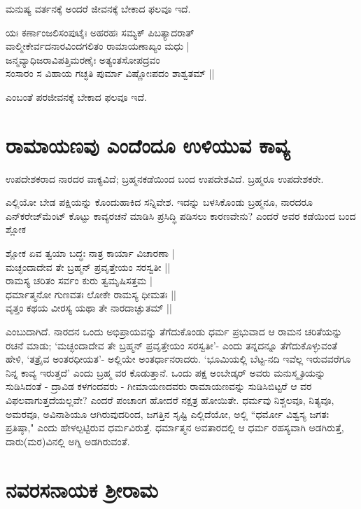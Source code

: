 ಮನುಷ್ಯ ವರ್ತನಕ್ಕೆ ಅಂದರೆ ಜೀವನಕ್ಕೆ ಬೇಕಾದ ಫಲವೂ ಇದೆ. 

\begin{shloka} 
ಯಃ ಕರ್ಣಾಂಜಲಿಸಂಪುಟೈಃ ಅಹರಹಃ ಸಮ್ಯಕ್‍ ಪಿಬತ್ಯಾದರಾತ್‍\\ 
ವಾಲ್ಮೀಕೇರ್ವದನಾರವಿಂದಗಲಿತಂ ರಾಮಾಯಣಾಖ್ಯಂ ಮಧು |\\ 
ಜನ್ಮವ್ಯಾಧಿಜರಾವಿಪತ್ತಿಮರಣೈಃ ಅತ್ಯಂತಸೋಪದ್ರವಂ\\ 
ಸಂಸಾರಂ ಸ ವಿಹಾಯ ಗಚ್ಛತಿ ಪುರ್ಮಾ ವಿಷ್ಣೋಃಪದಂ ಶಾಶ್ವತಮ್‍ ||
\end{shloka} 
ಎಂಬಂತೆ ಪರಜೀವನಕ್ಕೆ ಬೇಕಾದ ಫಲವೂ ಇದೆ. 

\section*{ರಾಮಾಯಣವು ಎಂದೆಂದೂ ಉಳಿಯುವ ಕಾವ್ಯ} 

ಉಪದೇಶಕರಾದ ನಾರದರ ವಾಕ್ಯವಿದೆ; ಬ್ರಹ್ಮನಕಡೆಯಿಂದ ಬಂದ ಉಪದೇಶವಿದೆ. ಬ್ರಹ್ಮರೂ ಉಪದೇಶಕರೇ. 


ಎಲ್ಲಿಯೋ ಬೇಡ ಪಕ್ಷಿಯನ್ನು ಕೊಂದುಹಾಕಿದ ಸನ್ನಿವೇಶ. ಇದನ್ನು ಬಳಸಿಕೊಂಡು ಬ್ರಹ್ಮನೂ, ನಾರದರೂ ಎನ್‍ಕರೇಜ್‍ಮೆಂಟ್‍ {} ಕೊಟ್ಟು ಕಾವ್ಯರಚನೆ ಮಾಡಿಸಿ ಪ್ರಸಿದ್ಧಿ ಪಡಿಸಲು ಕಾರಣವೇನು? ಎಂದರೆ ಅವರ ಕಡೆಯಿಂದ ಬಂದ ಶ್ಲೋಕ 


\begin{shloka}
ಶ್ಲೋಕ ಏವ ತ್ವಯಾ ಬದ್ಧಃ ನಾತ್ರ ಕಾರ್ಯಾ ವಿಚಾರಣಾ |\\ 
ಮಚ್ಛಂದಾದೇವ ತೇ ಬ್ರಹ್ಮನ್‍ ಪ್ರವೃತ್ತೇಯಂ ಸರಸ್ವತೀ ||\\ 
ರಾಮಸ್ಯ ಚರಿತಂ ಸರ್ವಂ ಕುರು ತ್ವಮೃಷಿಸತ್ತಮ |\\ 
ಧರ್ಮಾತ್ಮನೋ ಗುಣವತಃ ಲೋಕೇ ರಾಮಸ್ಯ ಧೀಮತಃ ||\\ 
ವೃತ್ತಂ ಕಥಯ ವೀರಸ್ಯ ಯಥಾ ತೇ ನಾರದಾಚ್ಘುತಮ್‍ ||
\end{shloka} 
ಎಂಬುದಾಗಿದೆ. ನಾರದನ ಒಂದು ಅಭಿಪ್ರಾಯವನ್ನು ತೆಗೆದುಕೊಂಡು ಧರ್ಮ ಪ್ರಭುವಾದ ಆ ರಾಮನ ಚರಿತೆಯನ್ನು ರಚನೆ ಮಾಡು; `ಮಚ್ಛಂದಾದೇವ ತೇ ಬ್ರಹ್ಮನ್‍ ಪ್ರವೃತ್ತೇಯಂ ಸರಸ್ವತೀ'- ಎಂದು ತನ್ನದನ್ನೂ ತೆಗೆದುಕೊಳ್ಳುವಂತೆ ಹೇಳಿ, `ತತ್ರೈವ ಅಂತರಧೀಯತ'- ಅಲ್ಲಿಯೇ ಅಂತರ್ಧಾನರಾದರು. `ಭೂಮಿಯಲ್ಲಿ ಬೆಟ್ಟ-ನದಿ ಇವೆಲ್ಲ ಇರುವವರೆಗೂ ನಿನ್ನ ಕಾವ್ಯ ಇರುತ್ತದೆ' ಎಂದು ಬ್ರಹ್ಮ ವರ ಕೊಡುತ್ತಾನೆ. ಒಂದು ಪಕ್ಷ ಅಂಬೇಡ್ಕರ್‍ ಅವರು ಮನುಸ್ಮೃತಿಯನ್ನು ಸುಡಿಸಿದಂತೆ - ದ್ರಾವಿಡ ಕಳಗಂದವರು - ಗೀಮಾಯಣದವರು ರಾಮಾಯಣವನ್ನು ಸುಡಿಸಿಬಿಟ್ಟರೆ ಆ ವರ ವಿಫಲವಾಗುತ್ತದೆಯಲ್ಲವೇ? ಎಂದರೆ ಪಂಚಾಂಗ ಹೋದರೆ ನಕ್ಷತ್ರ ಹೋಯಿತೇ. ಧರ್ಮವು ನಿಶ್ಚಲವೂ, ನಿತ್ಯವೂ, ಅಮರವೂ, ಅವಿನಾಶಿಯೂ ಆಗಿರುವುದರಿಂದ, ಜಗತ್ತಿನ ಸೃಷ್ಟಿ ಎಲ್ಲಿದೆಯೋ, ಅಲ್ಲಿ ``ಧರ್ಮೋ ವಿಶ್ವಸ್ಯ ಜಗತಃ ಪ್ರತಿಷ್ಠಾ," ಎಂದು ಹೇಳಲ್ಪಟ್ಟಿರುವ ಧರ್ಮವಿರುತ್ತೆ. ಧರ್ಮಾತ್ಮನ ಅವತಾರದಲ್ಲಿ ಆ ಧರ್ಮ ರಹಸ್ಯವಾಗಿ ಅಡಗಿರುತ್ತೆ, ದಾರು(ಮರ)ವಿನಲ್ಲಿ ಅಗ್ನಿ ಅಡಗಿರುವಂತೆ. 


\section*{ನವರಸನಾಯಕ ಶ್ರೀರಾಮ} 

